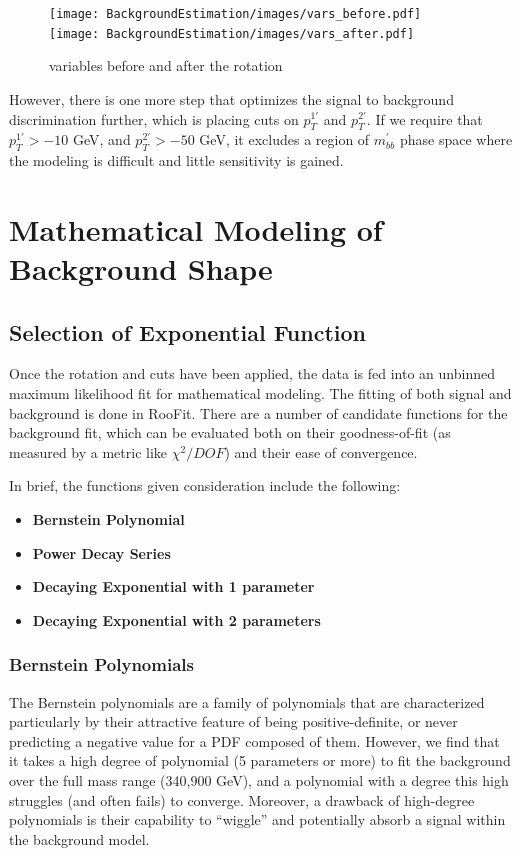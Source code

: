 \begin{figure}[hbt]
\texttt{[image: BackgroundEstimation/images/vars\_before.pdf]}
\texttt{[image: BackgroundEstimation/images/vars\_after.pdf]}
\caption{variables before and after the rotation\label{fig:ttbar_mbb}}
\end{figure}

However, there is one more step that optimizes the signal to background
discrimination further, which is placing cuts on $p_T^{1'}$ and $p_T^{2'}$.
If we require that $p_T^{1'}>-10$ GeV, and $p_T^{2'}>-50$ GeV, it 
excludes a region of $m_{bb}^{'}$ phase space where the modeling is difficult
and little sensitivity is gained.  






\section{Mathematical Modeling of Background Shape}
\subsection{Selection of Exponential Function}
Once the rotation and cuts have been applied, the data is fed into an 
unbinned maximum likelihood fit for mathematical modeling.  The fitting
of both signal and background is done in RooFit.  There are a number 
of candidate functions for the background fit, which can be evaluated
both on their goodness-of-fit (as measured by a metric like $\chi^2/DOF$)
and their ease of convergence.

In brief, the functions given consideration include the following:
\begin{itemize}
    \item \textbf{Bernstein Polynomial}
    \item \textbf{Power Decay Series}
    \item \textbf{Decaying Exponential with 1 parameter}
    \item \textbf{Decaying Exponential with 2 parameters}
\end{itemize}

\subsubsection{Bernstein Polynomials}
The Bernstein polynomials are a family of polynomials that are characterized
particularly by their attractive feature of being positive-definite, or never
predicting a negative value for a PDF composed of them.  However, we find
that it takes a high degree of polynomial (5 parameters or more) to fit the
background over the full mass range (340,900 GeV), and a polynomial with a 
degree this high struggles (and often fails) to converge.  Moreover, a
drawback of high-degree polynomials is their capability to ``wiggle'' and
potentially absorb a signal within the background model.

